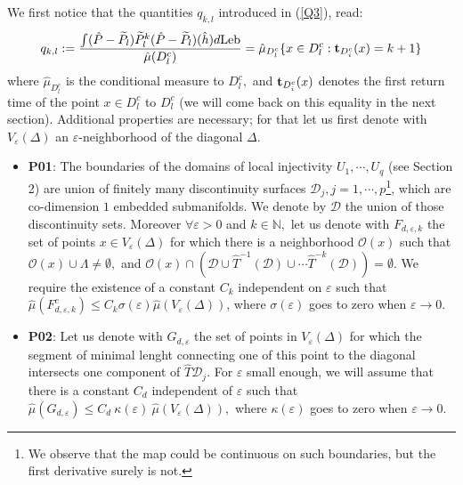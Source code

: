 \documentclass[12pt,reqno,a4paper]{amsart}
\let\tilde\widetilde
\def\Le{\text{Leb}}
\def\P{\hat{P}}
\begin{document}
    We first notice that the quantities $q_{k,l}$ introduced in (\ref{Q3}), read:
\begin{equation}\label{PIVA}
q_{k,l}:=\frac{\int (\P-\tilde{P}_l)\tilde{P}_l^k(\P-\tilde{P}_l)(\hat{h})d\Le}{\hat{\mu}(D^c_l)}=\hat{\mu}_{D^c_l}
\{x\in D^c_l :{\bf t}_{D^c_i}(x)=k+1\}
\end{equation}
where $\hat{\mu}_{D^c_l}$  is the conditional measure to $D^c_l,$ and ${\bf t}_{D^c_i}(x)$ denotes the first return
 time of the point $x\in D^c_l$ to $D^c_l$ (we will come back on this equality in the next section). Additional properties are necessary; for that let us first  denote with $V_{\varepsilon}(\Delta)$ an $\varepsilon$-neighborhood
  of the diagonal $\Delta.$

\begin{itemize}
\item {\bf P01}: The boundaries of the domains of local injectivity $U_1,\cdots, U_q$ (see Section 2) are union of  finitely many discontinuity surfaces $\mathcal{D}_j, j=1,\cdots,p$\footnote{We observe that the map could be continuous on such boundaries, but the first derivative surely is not.}, which  are   co-dimension $1$ embedded submanifolds.  We denote by $\mathcal{D}$ the union of those discontinuity sets. Moreover $\forall \varepsilon>0$ and $k\in \mathbb{N},$  let us denote with $F_{d, \varepsilon, k}$ the set of points $x\in V_{\varepsilon}(\Delta)$ for which there is  a neighborhood $\mathcal{O}(x)$ such that $\mathcal{O}(x)\cup \Lambda\neq \emptyset,$  and  $\mathcal{O}(x)\cap (\mathcal{D}\cup \hat{T}^{-1}(\mathcal{D})\cup \cdots \hat{T}^{-k}(\mathcal{D}))=\emptyset.$  We require the existence of a constant $C_k$ independent on $\varepsilon$  such that $\hat{\mu}(F_{d, \varepsilon, k}^c)\le C_k \sigma(\varepsilon)\hat{\mu}(V_{\varepsilon}(\Delta))$, where $\sigma(\varepsilon)$ goes to zero when $\varepsilon\rightarrow 0.$\\

\item {\bf P02}: Let us denote with $G_{d, \varepsilon}$ the set of points in $V_{\varepsilon}(\Delta)$ for which   the   segment of minimal lenght connecting one of this point to the diagonal intersects
one component of $\hat{T}{\mathcal D}_j.$ For $\varepsilon$ small enough, we will assume that
  there is a constant $C_d$ independent of $\varepsilon$  such that $\hat{\mu}(G_{d, \varepsilon})\le C_d \ \kappa(\varepsilon) \ \hat{\mu}(V_{\varepsilon}(\Delta)),$ where $\kappa(\varepsilon)$ goes to zero when $\varepsilon\rightarrow 0.$
\end{itemize}
\end{document}
